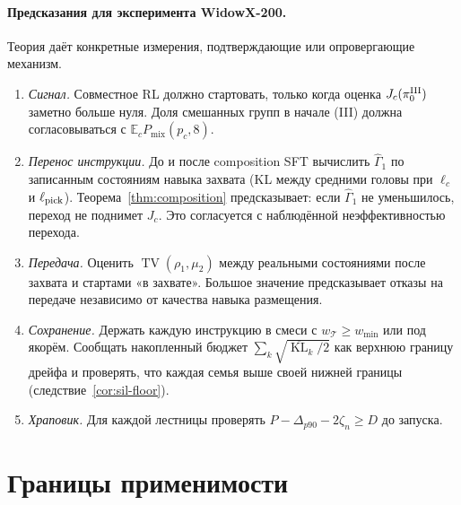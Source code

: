 \documentclass[11pt,a4paper]{article}
\theoremstyle{plain}
\theoremstyle{definition}
\theoremstyle{remark}
\newcommand{\E}{\mathbb{E}}
\DeclareMathOperator{\TV}{TV}
\DeclareMathOperator{\KL}{KL}
\newcommand{\cT}{\mathcal{T}}
\newcommand{\Pmix}{P_{\mathrm{mix}}}
\begin{document}
\paragraph{Предсказания для эксперимента WidowX-200.} Теория даёт конкретные измерения, подтверждающие или опровергающие механизм.
\begin{enumerate}
\item \emph{Сигнал.} Совместное RL должно стартовать, только когда оценка $J_c(\pi^{\rm III}_0)$ заметно больше нуля. Доля смешанных групп в начале (III) должна согласовываться с $\E_c\Pmix(p_c,8)$.
\item \emph{Перенос инструкции.} До и после composition SFT вычислить $\hat\Gamma_1$ по записанным состояниям навыка захвата (KL между средними головы при $\ell_c$ и $\ell_{\rm pick}$). Теорема~\ref{thm:composition} предсказывает: если $\hat\Gamma_1$ не уменьшилось, переход не поднимет $J_c$. Это согласуется с наблюдённой неэффективностью перехода.
\item \emph{Передача.} Оценить $\TV(\rho_1,\mu_2)$ между реальными состояниями после захвата и стартами «в захвате». Большое значение предсказывает отказы на передаче независимо от качества навыка размещения.
\item \emph{Сохранение.} Держать каждую инструкцию в смеси с $w_\cT\ge w_{\min}$ или под якорём. Сообщать накопленный бюджет $\sum_k\sqrt{\overline{\KL}_k/2}$ как верхнюю границу дрейфа и проверять, что каждая семья выше своей нижней границы (следствие~\ref{cor:sil-floor}).
\item \emph{Храповик.} Для каждой лестницы проверять $P-\Delta_{p90}-2\zeta_n\ge D$ до запуска.
\end{enumerate}

\section{Границы применимости}\label{sec:limits}
\end{document}
